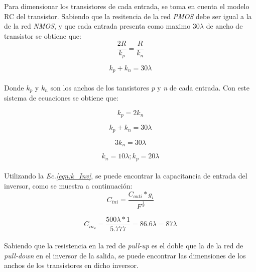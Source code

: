 \documentclass[12pt,a4paper]{article} %
\begin{document}
Para dimensionar los transistores de cada entrada, se toma en cuenta el modelo RC del transistor. Sabiendo que la resitencia de la red \textit{PMOS} debe ser igual a la de la red \textit{NMOS}, y que cada entrada presenta como maximo 30$\lambda$ de ancho de transistor se obtiene que:\\

\begin{equation}\label{eqn:R}
\frac{2R}{k_p} = \frac{R}{k_n}
\end{equation}

\begin{equation}\label{eqn:k}
k_p + k_n = 30\lambda
\end{equation}\\

Donde \textit{$k_{p}$} y \textit{$k_{n}$} son los anchos de los tansistores \textit{p} y \textit{n} de cada entrada. Con este sistema de ecuaciones se obtiene que:

\begin{equation}\label{eqn:R1}
k_p = 2k_n
\end{equation}

\begin{equation}\label{eqn:k1}
k_p + k_n = 30\lambda
\end{equation}

\begin{equation}\label{eqn:k2}
3k_n = 30\lambda
\end{equation}

\begin{equation}\label{eqn:k3}
k_n = 10\lambda ; k_p = 20\lambda
\end{equation}\\

Utilizando la \textit{Ec.\ref{eqn:k_Inv}}, se puede encontrar la capacitancia de entrada del inversor, como se muestra a continuación:\\

\begin{equation}\label{eqn:k_Inv}
C_{ini}= \frac{C_{outi}*g_{i}}{F^{\frac{1}{N}}}
\end{equation}

\begin{equation}\label{eqn:k_Inv2}
{C_{in}}_{i}= \frac{500\lambda*1}{5.777} = 86.6\lambda = 87\lambda
\end{equation}\\

Sabiendo que la resistencia en la red de \textit{pull-up} es el doble que la de la red de \textit{pull-down} en el inversor de la salida, se puede encontrar las dimensiones de los anchos de los transistores en dicho inversor.\\
\end{document}
